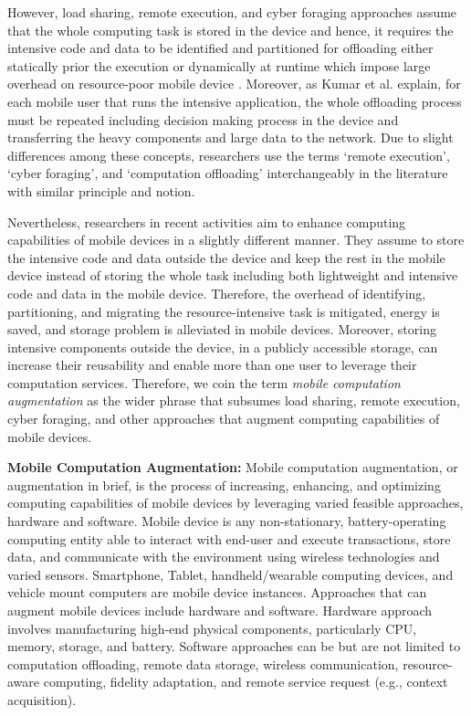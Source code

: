 \documentclass[publish]{IEEEtran}
\begin{document}
However, load sharing, remote execution, and cyber foraging approaches assume that the whole computing task is stored in the device and hence, it requires the intensive code and data to be identified and partitioned for offloading \textemdash either statically prior the execution or dynamically at runtime \textemdash which impose large overhead on resource-poor mobile device \cite{Sharifi2011}. Moreover, as Kumar et al. \cite{Kumar2012} explain, for each mobile user that runs the intensive application, the whole offloading process must be repeated including decision making process in the device and transferring the heavy components and large data to the network. Due to slight differences among these concepts, researchers use the terms `remote execution', `cyber foraging', and `computation offloading' interchangeably in the literature with similar principle and notion.

Nevertheless, researchers in recent activities  \cite{Lu2011,March2011, MOMCC, SAMI} aim to enhance computing capabilities of mobile devices in a slightly different manner. They assume to store the intensive code and data outside the device and keep the rest in the mobile device instead of storing the whole task \textemdash including both lightweight and intensive code and data \textemdash in the mobile device. Therefore, the overhead of identifying, partitioning, and migrating the resource-intensive task is mitigated, energy is saved, and storage problem is alleviated in mobile devices. Moreover, storing intensive components outside the device, in a publicly accessible storage, can increase their reusability and enable more than one user to leverage their computation services. Therefore, we coin the term \textit{mobile computation augmentation} as the wider phrase that subsumes load sharing, remote execution, cyber foraging, and other approaches that augment computing capabilities of mobile devices. 

\textbullet \textbf{ Mobile Computation Augmentation:}
Mobile computation augmentation, or augmentation in brief, is the process of increasing, enhancing, and optimizing computing capabilities of mobile devices by leveraging varied feasible approaches, hardware and software. Mobile device is any non-stationary, battery-operating computing entity able to interact with end-user and execute transactions, store data, and communicate with the environment using wireless technologies and varied sensors. Smartphone, Tablet, handheld/wearable computing devices, and vehicle mount computers are mobile device instances. Approaches that can augment mobile devices include hardware and software. Hardware approach involves manufacturing high-end physical components, particularly CPU, memory, storage, and battery. Software approaches can be \textemdash but are not limited to \textemdash computation offloading, remote data storage, wireless communication, resource-aware computing, fidelity adaptation, and remote service request (e.g., context acquisition). 
\end{document}
